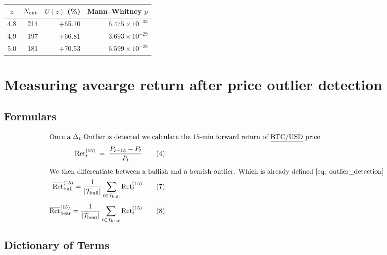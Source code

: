 \documentclass[12pt]{article}
\begin{document}
\begin{table}[H]
  \centering
  
  \label{tap:top3-z-out-of-sample}
  \begin{tabular}{@{} c  r  r  r @{}}  
    \toprule
    $z$ & $N_{\rm out}$ & $U(z)$ (\%) & Mann–Whitney $p$ \\  
  \midrule
  4.8 & 214 & +65.10 & $6.475\times10^{-33}$ \\  
  4.9 & 197 & +66.81 & $3.693\times10^{-29}$ \\  
  5.0 & 181 & +70.53 & $6.599\times10^{-28}$ \\ 
\bottomrule
\end{tabular}

\end{table}












\newpage
\section*{Measuring avearge return after price outlier detection}




\subsection*{Formulars}
\begin{align}
\intertext{Once a $\Delta_t$ Outlier is detected we calculate the 15-min forward return of \underline{BTC/USD} price}
\mathrm{Ret}^{(15)}_t
\;=\;\frac{P_{t+15} - P_t}{P_t}
\tag{4}\\[1ex]
\intertext{We then differentiate between a bullish and a bearish outlier. Which is already defined \eqref{eq: outlier_detection}}
\overline{\mathrm{Ret}}^{(15)}_{\rm bull}
= \frac{1}{|\mathcal{T}_{\rm bull}|}
  \sum_{t\in\mathcal{T}_{\rm bull}} \mathrm{Ret}^{(15)}_t
\tag{7}\\[1ex]
\overline{\mathrm{Ret}}^{(15)}_{\rm bear}
= \frac{1}{|\mathcal{T}_{\rm bear}|}
  \sum_{t\in\mathcal{T}_{\rm bear}} \mathrm{Ret}^{(15)}_t
\tag{8}
\end{align}







\subsection*{Dictionary of Terms}
\end{document}
